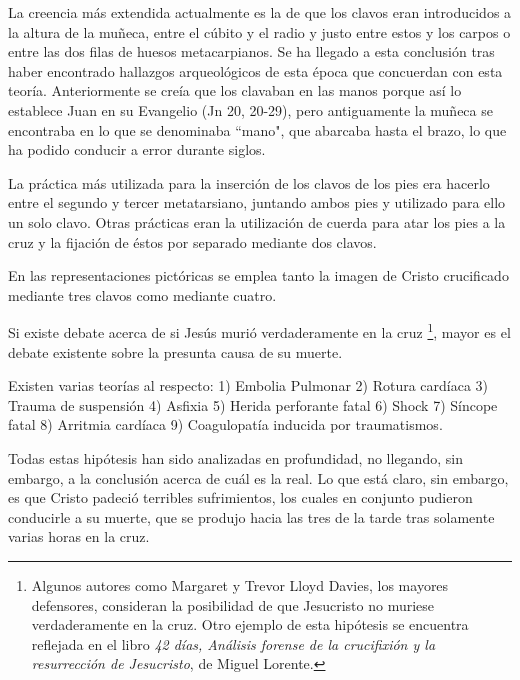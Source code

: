 La creencia más extendida actualmente es la de que los clavos eran introducidos a la altura de la muñeca, entre el cúbito y el radio y justo entre estos y los carpos o entre las dos filas de huesos metacarpianos. Se ha llegado a esta conclusión tras haber encontrado hallazgos arqueológicos de esta época que concuerdan con esta teoría. Anteriormente se creía que los clavaban en las manos porque así lo establece Juan en su Evangelio (Jn 20, 20-29), pero antiguamente la muñeca se encontraba en lo que se denominaba ``mano", que abarcaba hasta el brazo, lo que ha podido conducir a error durante siglos.

La práctica más utilizada para la inserción de los clavos de los pies era hacerlo entre el segundo y tercer metatarsiano, juntando ambos pies y utilizado para ello un solo clavo. Otras prácticas eran la utilización de cuerda para atar los pies a la cruz y la fijación de éstos por separado mediante dos clavos.

En las representaciones pictóricas se emplea tanto la imagen de Cristo crucificado mediante tres clavos como mediante cuatro.


Si existe debate acerca de si Jesús murió verdaderamente en la cruz \footnote{Algunos autores como Margaret y Trevor Lloyd Davies, los mayores defensores, consideran la posibilidad de que Jesucristo no muriese verdaderamente en la cruz. Otro ejemplo de esta hipótesis se encuentra reflejada en el libro \textit{42 días, Análisis forense de la crucifixión y la resurrección de Jesucristo}, de Miguel Lorente.}, mayor es el debate existente sobre la presunta causa de su muerte.

Existen varias teorías al respecto: 1) Embolia Pulmonar 2) Rotura cardíaca 3) Trauma de suspensión 4) Asfixia 5) Herida perforante fatal 6) Shock 7) Síncope fatal 8) Arritmia cardíaca 9) Coagulopatía inducida por traumatismos.

Todas estas hipótesis han sido analizadas en profundidad, no llegando, sin embargo, a la conclusión acerca de cuál es la real. Lo que está claro, sin embargo, es que Cristo padeció terribles sufrimientos, los cuales en conjunto pudieron conducirle a su muerte, que se produjo hacia las tres de la tarde tras solamente varias horas en la cruz.

